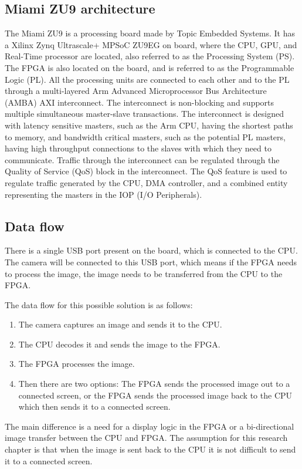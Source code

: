 \documentclass{article}
\begin{document}
\subsection{Miami ZU9 architecture}
The Miami ZU9 is a processing board made by Topic Embedded Systems. 
It has a Xilinx Zynq Ultrascale+ MPSoC ZU9EG on board, where the CPU, GPU, and Real-Time processor are located, also referred to as the Processing System (PS).
The FPGA is also located on the board, and is referred to as the Programmable Logic (PL).
\bigskip
All the processing units are connected to each other and to the PL through a multi-layered Arm Advanced Microprocessor Bus Architecture (AMBA) AXI interconnect.
The interconnect is non-blocking and supports multiple simultaneous master-slave transactions.
The interconnect is designed with latency sensitive masters, such as the Arm CPU, having the shortest paths to memory, and bandwidth critical masters, such as the potential PL masters, having high throughput connections to the slaves with which they need to communicate.
Traffic through the interconnect can be regulated through the Quality of Service (QoS) block in the interconnect.
The QoS feature is used to regulate traffic generated by the CPU, DMA controller, and a combined entity representing the masters in the IOP (I/O Peripherals).

\subsection{Data flow}
There is a single USB port present on the board, which is connected to the CPU.
The camera will be connected to this USB port, which means if the FPGA needs to process the image, the image needs to be transferred from the CPU to the FPGA.

The data flow for this possible solution is as follows:
\begin{enumerate}
    \item The camera captures an image and sends it to the CPU.
    \item The CPU decodes it and sends the image to the FPGA.
    \item The FPGA processes the image.
    \item Then there are two options: The FPGA sends the processed image out to a connected screen, or the FPGA sends the processed image back to the CPU which then sends it to a connected screen.
\end{enumerate}
The main difference is a need for a display logic in the FPGA or a bi-directional image transfer between the CPU and FPGA.
The assumption for this research chapter is that when the image is sent back to the CPU it is not difficult to send it to a connected screen.
\end{document}
